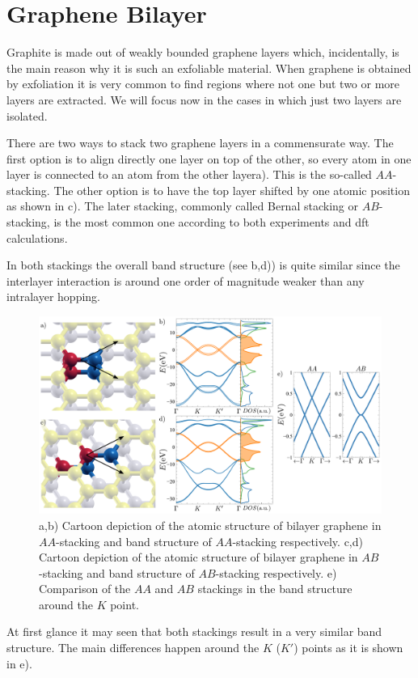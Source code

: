 \chapter{Graphene Bilayer}
\label{ch:bilayer}
Graphite is made out of weakly bounded graphene layers which, incidentally, is the main reason why it is such an exfoliable material. When graphene is obtained by exfoliation it is very common to find regions where not one but two or more layers are extracted. We will focus now in the cases in which just two layers are isolated.

There are two ways to stack two graphene layers in a commensurate way. The first option is to align directly one layer on top of the other, so every atom in one layer is connected to an atom from the other layera). This is the so-called $AA$-stacking.
The other option is to have the top layer shifted by one atomic position as shown in c). The later stacking, commonly called Bernal stacking or $AB$-stacking, is the most common one according to both experiments and \ac{dft} calculations\cite{Norimatsu2010,Charlier1994,Charlier1994a}.

In both stackings the overall band structure (see b,d)) is quite similar since the interlayer interaction is around one order of magnitude weaker than any intralayer hopping.
\begin{figure}[h!]
\centering
\includegraphics{graphene_bilayer/figures/bilayer_stackings.pdf}
\vspace{-20pt}
\caption{a,b) Cartoon depiction of the atomic structure of bilayer graphene in $AA$-stacking and band structure of $AA$-stacking respectively. c,d) Cartoon depiction of the atomic structure of bilayer graphene in $AB$-stacking and band structure of $AB$-stacking respectively. e) Comparison of the $AA$ and $AB$ stackings in the band structure around the $K$ point.}
\label{Gbi_stack}
\end{figure}
\FloatBarrier
At first glance it may seen that both stackings result in a very similar band structure. The main differences happen around the $K$ ($K'$) points as it is shown in e).


